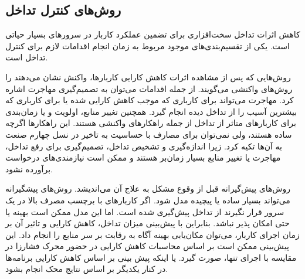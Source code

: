 \subsection{روش‌های کنترل تداخل}

کاهش اثرات تداخل سخت‌افزاری برای تضمین عملکرد کاربار در سرورهای  بسیار حیاتی است. یکی از تقسیم‌بندی‌های موجود مربوط به زمان انجام اقدامات لازم برای کنترل تداخل است. 

روش‌هایی که پس از مشاهده اثرات کاهش کارایی کاربارها، واکنش نشان می‌دهند را روش‌های واکنشی می‌گویند. از جمله اقدامات می‌توان به تصمیم‌گیری مهاجرت اشاره کرد. مهاجرت می‌تواند برای کارباری که موجب کاهش کارایی شده یا برای کارباری که بیشترین آسیب را از تداخل دیده انجام گیرد. همچنین تغییر منابع، اولویت و یا زمان‌بندی برای کاربارهای متاثر از تداخل از جمله راهکارهای واکنشی هستند. این راهکارها اگرچه ساده هستند، ولی نمی‌توان برای مصارف با حساسیت به تاخیر در نسل چهارم صنعت به آن‌ها تکیه کرد. زیرا اندازه‌گیری و تشخیص تداخل، تصمیم‌گیری برای رفع تداخل، مهاجرت یا تغییر منابع بسیار زمان‌بر هستند و ممکن است نیازمندی‌های درخواست برآورده نشود.

روش‌های پیش‌گیرانه قبل از وقوع مشکل به علاج آن می‌اندیشد. روش‌های پیشگیرانه می‌تواند بسیار ساده یا پیچیده مدل شود. اگر کاربارهای با برچسب مصرف بالا در یک سرور  قرار نگیرند از تداخل پیش‌گیری شده است. اما این مدل ممکن است بهینه یا حتی امکان پذیر نباشد. بنابراین با پیش‌بینی میزان تداخل، کاهش کارایی و تاثیر آن بر زمان اجرای کاربار، می‌توان مکان‌یابی بهینه آگاه به رقابت بر سر منابع را انجام داد. این پیش‌بینی ممکن است بر اساس محاسبات کاهش کارایی در حضور محرک فشارزا در مقایسه با اجرای تنها، صورت گیرد. یا اینکه پیش بینی بر اساس کاهش کارایی برنامه‌ها در کنار یکدیگر بر اساس نتایج محک انجام بشود.
